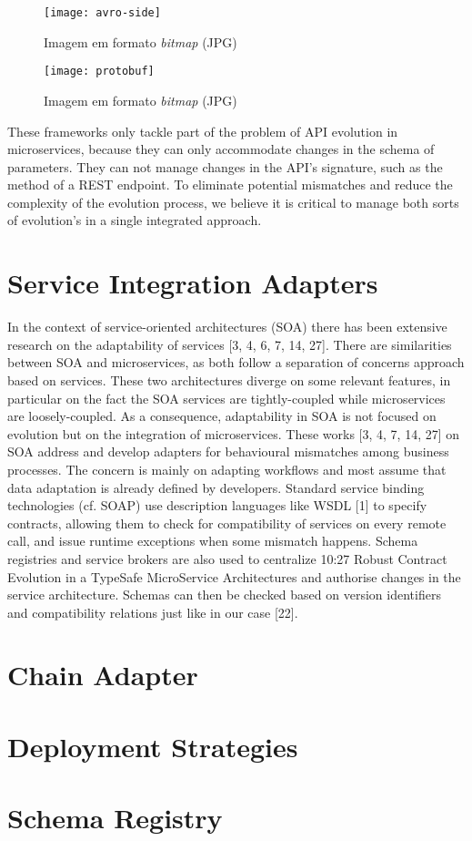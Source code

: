 \begin{figure}[htbp]
    \centering
    \texttt{[image: avro-side]}
    \caption{Imagem em formato \emph{bitmap} (JPG)}
    \label{fig:Figuras_Tree_silhouettes-bitmap}
\end{figure}

\begin{figure}[htbp]
    \centering
    \texttt{[image: protobuf]}
    \caption{Imagem em formato \emph{bitmap} (JPG)}
    \label{fig:Figuras_Tree_silhouettes-bitmap}
\end{figure}

These frameworks only tackle part of the problem of API evolution in microservices,
because they can only accommodate changes in the schema of parameters.
They can not manage changes in the API's signature, such as the method of a REST endpoint.
To eliminate potential mismatches and reduce the complexity of the evolution process, we believe it is critical to manage both sorts of evolution's in a single integrated approach.

\section{Service Integration Adapters} %
\label{sec:service_integration_adapters}

In the context of service-oriented architectures (SOA) there has been extensive
research on the adaptability of services [3, 4, 6, 7, 14, 27]. There are similarities
between SOA and microservices, as both follow a separation of concerns approach
based on services. These two architectures diverge on some relevant features, in
particular on the fact the SOA services are tightly-coupled while microservices are
loosely-coupled. As a consequence, adaptability in SOA is not focused on evolution
but on the integration of microservices. These works [3, 4, 7, 14, 27] on SOA address
and develop adapters for behavioural mismatches among business processes. The
concern is mainly on adapting workflows and most assume that data adaptation is
already defined by developers. Standard service binding technologies (cf. SOAP) use
description languages like WSDL [1] to specify contracts, allowing them to check for
compatibility of services on every remote call, and issue runtime exceptions when some
mismatch happens. Schema registries and service brokers are also used to centralize
10:27
Robust Contract Evolution in a TypeSafe MicroService Architectures
and authorise changes in the service architecture. Schemas can then be checked based
on version identifiers and compatibility relations just like in our case [22].

\section{Chain Adapter} %
\label{sec:chain_adapter}

\section{Deployment Strategies} %
\label{sec:deployment_strategies}

\section{Schema Registry} %
\label{sec:schema_registry}
